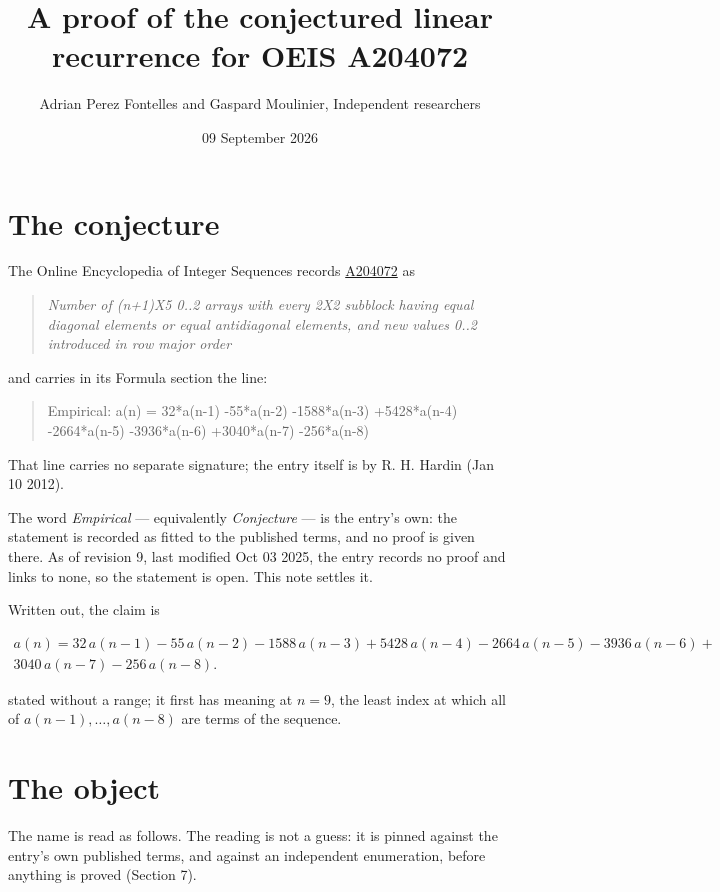 \documentclass[11pt]{article}
\title{A proof of the conjectured linear recurrence for OEIS A204072}
\author{Adrian Perez Fontelles and Gaspard Moulinier, Independent researchers}
\date{09 September 2026}
\theoremstyle{definition}
\begin{document}
\maketitle
\section{The conjecture}

The Online Encyclopedia of Integer Sequences records \href{https://oeis.org/A204072}{A204072} as

\begin{quote}\itshape Number of (n+1)X5 0..2 arrays with every 2X2 subblock having equal diagonal elements or equal antidiagonal elements, and new values 0..2 introduced in row major order\end{quote}

and carries in its Formula section the line:

\begin{quote}\ttfamily Empirical: a(n) = 32*a(n-1) -55*a(n-2) -1588*a(n-3) +5428*a(n-4) -2664*a(n-5) -3936*a(n-6) +3040*a(n-7) -256*a(n-8)\end{quote}

That line carries no separate signature; the entry itself is by R. H. Hardin (Jan 10 2012).

The word {\itshape Empirical} --- equivalently {\itshape Conjecture} --- is the entry's own: the statement is recorded as fitted to the published terms, and no proof is given there. As of revision 9, last modified Oct 03 2025, the entry records no proof and links to none, so the statement is open. This note settles it.

Written out, the claim is

\begin{multline*} a(n) = 32\,a(n-1) - 55\,a(n-2) - 1588\,a(n-3) + 5428\,a(n-4) - 2664\,a(n-5) - 3936\,a(n-6) + \\ 3040\,a(n-7) - 256\,a(n-8). \end{multline*}

stated without a range; it first has meaning at $n = 9$, the least index at which all of $a(n-1),\dots,a(n-8)$ are terms of the sequence.

\section{The object}

The name is read as follows. The reading is not a guess: it is pinned against the entry's own published terms, and against an independent enumeration, before anything is proved (Section 7).
\end{document}
